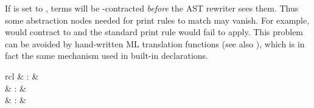 \begin{isabellebody}
\begin{isamarkuptext}
  \begin{warn}
  If \hyperlink{attribute.eta-contract}{\mbox{}} is set to , terms
  will be -contracted \emph{before} the AST rewriter sees
  them.  Thus some abstraction nodes needed for print rules to match
  may vanish.  For example,  would contract
  to  and the standard print rule would fail to
  apply.  This problem can be avoided by hand-written ML translation
  functions (see also ), which is in fact the same
  mechanism used in built-in \hyperlink{keyword.binder}{\mbox{}} declarations.
  \end{warn}%
\end{isamarkuptext}%
\isamarkuptrue%
%
\isamarkuptrue%
%
\begin{isamarkuptext}%
\begin{matharray}{rcl}
    \hypertarget{command.parse-ast-translation}{\hyperlink{command.parse-ast-translation}{\mbox{}}} & : &  \\
    \hypertarget{command.parse-translation}{\hyperlink{command.parse-translation}{\mbox{}}} & : &  \\
    \hypertarget{command.print-translation}{\hyperlink{command.print-translation}{\mbox{}}} & : &  \\

\end{matharray}
\end{isamarkuptext}
\end{isabellebody}
